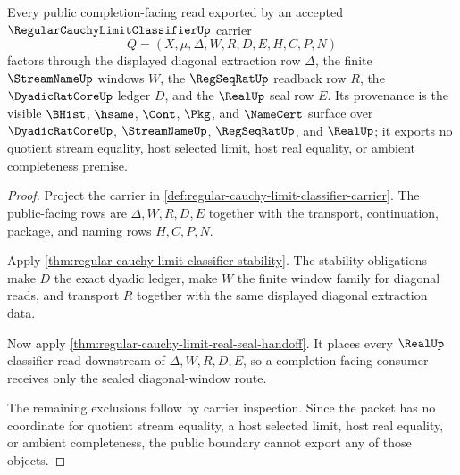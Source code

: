 \begin{theorem}
\label{thm:regular-cauchy-limit-classifier-diagonal-window-public-boundary}
Every public completion-facing read exported by an accepted $\RegularCauchyLimitClassifierUp$ carrier
$$
Q=(X,\mu,\Delta,W,R,D,E,H,C,P,N)
$$
factors through the displayed diagonal extraction row $\Delta$, the finite $\StreamNameUp$ windows $W$, the $\RegSeqRatUp$ readback row $R$, the $\DyadicRatCoreUp$ ledger $D$, and the $\RealUp$ seal row $E$. Its provenance is the visible $\BHist$, $\hsame$, $\Cont$, $\Pkg$, and $\NameCert$ surface over $\DyadicRatCoreUp$, $\StreamNameUp$, $\RegSeqRatUp$, and $\RealUp$; it exports no quotient stream equality, host selected limit, host real equality, or ambient completeness premise.
\end{theorem}
\begin{proof}
Project the carrier in \autoref{def:regular-cauchy-limit-classifier-carrier}. The public-facing rows are $\Delta,W,R,D,E$ together with the transport, continuation, package, and naming rows $H,C,P,N$.

Apply \autoref{thm:regular-cauchy-limit-classifier-stability}. The stability obligations make $D$ the exact dyadic ledger, make $W$ the finite window family for diagonal reads, and transport $R$ together with the same displayed diagonal extraction data.

Now apply \autoref{thm:regular-cauchy-limit-real-seal-handoff}. It places every $\RealUp$ classifier read downstream of $\Delta,W,R,D,E$, so a completion-facing consumer receives only the sealed diagonal-window route.

The remaining exclusions follow by carrier inspection. Since the packet has no coordinate for quotient stream equality, a host selected limit, host real equality, or ambient completeness, the public boundary cannot export any of those objects.
\end{proof}


